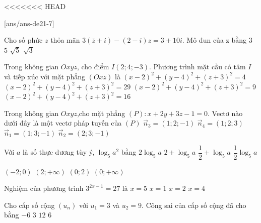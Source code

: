 <<<<<<< HEAD

[ans/ans-de21-7]

\begin{ex}%
Cho số phức $z$ thỏa mãn $3(\bar{z}+i)-(2-i) z=3+10 i$. Mô đun của z bằng
\choice
{$3$}
{$5$}
{\True $\sqrt{5}$}
{$\sqrt{3}$}

\end{ex}
\begin{ex}%
Trong không gian $O x y z$, cho điểm $I(2; 4;-3)$. Phương trình mặt cầu có tâm $I$ và tiếp xúc với mặt phẳng $(O x z)$ là
\choice
{$(x-2)^2+(y-4)^2+(z+3)^2=4$}
{$(x-2)^2+(y-4)^2+(z+3)^2=29$}
{$(x-2)^2+(y-4)^2+(z+3)^2=9$}
{\True $(x-2)^2+(y-4)^2+(z+3)^2=16$}

\end{ex}
\begin{ex}%
Trong không gian $O x y z$,cho mặt phẳng $(P)\colon x+2 y+3 z-1=0$. Vectơ nào dưới đây là một vectơ pháp tuyến của $(P)$ 
\choice
{$\vec{n}_3=(1; 2;-1)$}
{\True $\vec{n}_4=(1; 2; 3)$}
{$\vec{n}_1=(1; 3;-1)$}
{$\vec{n}_2=(2; 3;-1)$}

\end{ex}
\begin{ex}%
Với $a$ là số thực dương tùy ý, $\log_5 a^2$ bằng
\choice
{\True $2\log_5 a$}
{$2+\log_5 a$}
{$\dfrac{1}{2}+\log_5 a$}
{$\dfrac{1}{2} \log_5 a$}

\end{ex}
\begin{ex}%
{\vspace{-0.5cm}
}
\choice
{$(-2; 0)$}
{$(2;+\infty)$}
{\True $(0; 2)$}
{$(0;+\infty)$}
\end{ex}
\begin{ex}%
Nghiệm của phương trình $3^{2 x-1}=27$ là
\choice
{$x=5$}
{$x=1$}
{\True $x=2$}
{$x=4$}

\end{ex}
\begin{ex}%
Cho cấp số cộng $\left(u_n\right)$ với $u_1=3$ và $u_2=9$. Công sai của cấp số cộng đã cho bằng
\choice
{$-6$}
{$3$}
{$12$}
{\True $6$}

\end{ex}
